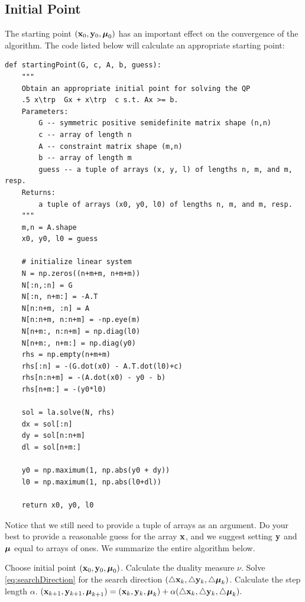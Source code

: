\subsection*{Initial Point}
The starting point $(\mathbf{x}_0, \mathbf{y}_0, \boldsymbol{\mu}_0)$ has an important effect on the convergence of the algorithm.
The code listed below will calculate an appropriate starting point:
\begin{lstlisting}
def startingPoint(G, c, A, b, guess):
    """
    Obtain an appropriate initial point for solving the QP
    .5 x\trp  Gx + x\trp  c s.t. Ax >= b.
    Parameters:
        G -- symmetric positive semidefinite matrix shape (n,n)
        c -- array of length n
        A -- constraint matrix shape (m,n)
        b -- array of length m
        guess -- a tuple of arrays (x, y, l) of lengths n, m, and m, resp.
    Returns:
        a tuple of arrays (x0, y0, l0) of lengths n, m, and m, resp.
    """
    m,n = A.shape
    x0, y0, l0 = guess

    # initialize linear system
    N = np.zeros((n+m+m, n+m+m))
    N[:n,:n] = G
    N[:n, n+m:] = -A.T
    N[n:n+m, :n] = A
    N[n:n+m, n:n+m] = -np.eye(m)
    N[n+m:, n:n+m] = np.diag(l0)
    N[n+m:, n+m:] = np.diag(y0)
    rhs = np.empty(n+m+m)
    rhs[:n] = -(G.dot(x0) - A.T.dot(l0)+c)
    rhs[n:n+m] = -(A.dot(x0) - y0 - b)
    rhs[n+m:] = -(y0*l0)

    sol = la.solve(N, rhs)
    dx = sol[:n]
    dy = sol[n:n+m]
    dl = sol[n+m:]

    y0 = np.maximum(1, np.abs(y0 + dy))
    l0 = np.maximum(1, np.abs(l0+dl))

    return x0, y0, l0
\end{lstlisting}
Notice that we still need to provide a tuple of arrays  as an argument.
Do your best to provide a reasonable guess for the array $\mathbf{x}$, and we suggest setting $\mathbf{y}$ and $\boldsymbol{\mu}$ equal to arrays of ones.
We summarize the entire algorithm below.

\begin{algorithm}[H]
\begin{algorithmic}[1]
    \State \textrm{Choose initial point } $(\mathbf{x}_0, \mathbf{y}_0, \boldsymbol{\mu}_0)$.
        \State \textrm{Calculate the duality measure} $\nu$.
        \State \textrm{Solve \ref{eq:searchDirection} for the search direction} $(\triangle \mathbf{x}_k, \triangle \mathbf{y}_k, \triangle \boldsymbol{\mu}_k)$.
        \State \textrm{Calculate the step length} $\alpha$.
        \State $(\mathbf{x}_{k+1}, \mathbf{y}_{k+1}, \boldsymbol{\mu}_{k+1}) = (\mathbf{x}_k, \mathbf{y}_k, \boldsymbol{\mu}_k) + \alpha(\triangle \mathbf{x}_k, \triangle \mathbf{y}_k, \triangle \boldsymbol{\mu}_k).$
    \EndWhile
\EndProcedure
\end{algorithmic}
\label{alg:intPt2}
\end{algorithm}


